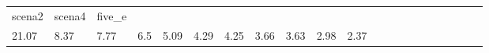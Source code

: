 \begin{table}
\begin{center}
\begin{tabular}{lllllllllllllllllllll}
    scena2
    
    
    &
    
    scena4
    
    
    &
    
    five_e
     \\

    
    
    21.07
    
    
    &
    
    8.37
    
    
    &
    
    7.77
    
    
    &
    
    6.5
    
    
    &
    
    5.09
    
    
    &
    
    4.29
    
    
    &
    
    4.25
    
    
    &
    
    3.66
    
    
    &
    
    3.63
    
    
    &
    
    2.98
    
    
    &
    
    2.37
     \\



\end{tabular}
\end{center}
\label{T:offmetrics}
\end{table}